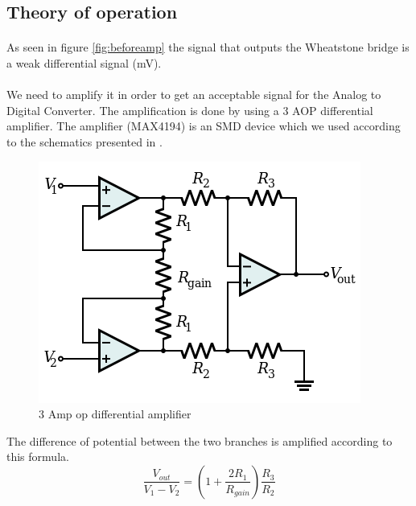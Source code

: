 \documentclass{article}[12pt]
\begin{document}
\subsection{Theory of operation}
\paragraph{}
As seen in figure \ref{fig:beforeamp} the signal that outputs the Wheatstone bridge is a weak differential signal (mV).
\paragraph{}
We need to amplify it in order to get an acceptable signal for the Analog to Digital Converter.
The amplification is done by using a 3 AOP differential amplifier. The amplifier (MAX4194) is an SMD device which we used according to the schematics presented in \cite{MaximIntegrated-2015}.
\begin{figure}[H]
    \centering
    \includegraphics[width = .4\textwidth]{figures/3AOP_differential_amplifier.png}
    \caption{3 Amp op differential amplifier}
    \label{fig:3OpAmp}
\end{figure}
The difference of potential between the two branches is amplified according to this formula.
\begin{equation}
    \dfrac{V_{out}}{V_1-V_2}=(1+\dfrac{2R_1}{R_{gain}})\dfrac{R_3}{R_2}
\end{equation}
\end{document}
